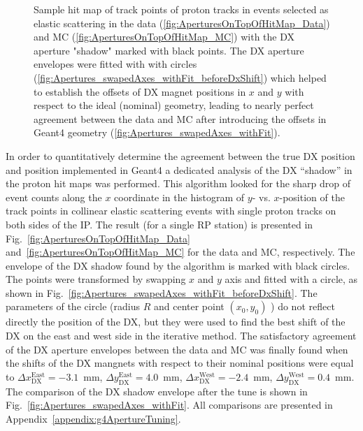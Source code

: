 \begin{figure}[b!]
{\begin{subfigure}[b]{\linewidth}
		\end{subfigure}
	}%
\caption[Sample hit map of elastically scattered protons in the data and MC with extracted envelopes of the DX apertures.]{Sample hit map of track points of proton tracks in events selected as elastic scattering in the data (\ref{fig:AperturesOnTopOfHitMap_Data}) and MC (\ref{fig:AperturesOnTopOfHitMap_MC}) with the DX aperture "shadow" marked with black points. The DX aperture envelopes were fitted with with circles (\ref{fig:Apertures_swapedAxes_withFit_beforeDxShift}) which helped to establish the offsets of DX magnet positions in $x$ and $y$ with respect to the ideal (nominal) geometry, leading to nearly perfect agreement between the data and MC after introducing the offsets in Geant4 geometry (\ref{fig:Apertures_swapedAxes_withFit}).}\label{fig:aperturesWithFit_Sample}%
\end{figure}

In order to quantitatively determine the agreement between the true DX position and position implemented in Geant4 a dedicated analysis of the DX ``shadow'' in the proton hit maps was performed. This algorithm looked for the sharp drop of event counts along the $x$ coordinate in the histogram of $y$- vs. $x$-position of the track points in collinear elastic scattering events with single proton tracks on both sides of the IP. The result (for a single RP station) is presented in Fig.~\ref{fig:AperturesOnTopOfHitMap_Data} and~\ref{fig:AperturesOnTopOfHitMap_MC} for the data and MC, respectively. The envelope of the DX shadow found by the algorithm is marked with black circles. The points were transformed by swapping $x$ and $y$ axis and fitted with a circle, as shown in Fig.~\ref{fig:Apertures_swapedAxes_withFit_beforeDxShift}. The parameters of the circle (radius $R$ and center point $(x_{0}, y_{0})$ ) do not reflect directly the position of the DX, but they were used to find the best shift of the DX on the east and west side in the iterative method. The satisfactory agreement of the DX aperture envelopes between the data and MC was finally found when the shifts of the DX mangnets with respect to their nominal positions were equal to $\Delta x_{\text{DX}}^{\text{East}} = -3.1$~mm, $\Delta y_{\text{DX}}^{\text{East}} = 4.0$~mm, $\Delta x_{\text{DX}}^{\text{West}} = -2.4$~mm, $\Delta y_{\text{DX}}^{\text{West}} = 0.4$~mm. The comparison of the DX shadow envelope after the tune is shown in Fig.~\ref{fig:Apertures_swapedAxes_withFit}. All comparisons are presented in Appendix~\ref{appendix:g4ApertureTuning}.


